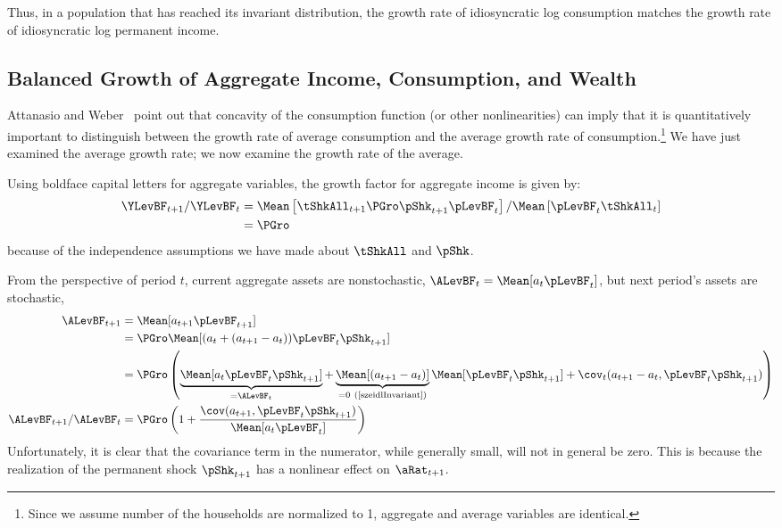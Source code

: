 \documentclass[BufferStockTheory]{subfiles}
\begin{document}
Thus, in a population that has reached its invariant distribution, the growth
rate of idiosyncratic log consumption matches the growth rate of idiosyncratic log permanent income.


\hypertarget{Growth-Rates-of-Aggregate-Income-and-Consumption}{}
\subsection{Balanced Growth of Aggregate Income, Consumption, and Wealth}
\label{subsec:cGroEqPGroQ}

Attanasio and Weber~\citeyearpar{aw95} point out that
concavity of the consumption function (or other nonlinearities) can
imply that it is quantitatively important to distinguish between the
growth rate of average consumption and the average growth rate of
consumption.\footnote{Since we assume number of the households are
  normalized to 1, aggregate and average variables are identical.}  We
have just examined the average growth rate; we now examine the growth
rate of the average.

Using boldface capital letters for aggregate
variables, the growth factor for aggregate income is given by:
\begin{align*}
  \YLevBF_{t+1}/\YLevBF_{t}  & = \Mean\left[\tShkAll_{t+1}\PGro \pShk_{t+1}\pLevBF_{t}\right]/\Mean\left[\pLevBF_{t}\tShkAll_{t}\right]  \\
                             & = \PGro
\end{align*}
because of the independence assumptions we have made about $\tShkAll$ and $\pShk$.

From the perspective of period $t$, current aggregate assets are nonstochastic, $\ALevBF_{t}=\Mean[a_{t} \pLevBF_{t}]$, but next period's assets are stochastic,   
\begin{align*}
  \ALevBF_{t+1} & = \Mean[a_{t+1} \pLevBF_{t+1}]
  \\              & = \PGro \Mean[(a_{t}+(a_{t+1}-a_{t}))\pLevBF_{t}\pShk_{t+1}]
  \\              & = \PGro \left(\underbrace{\Mean[a_{t}\pLevBF_{t}\pShk_{t+1}]}_{=\ALevBF_{t}}+\underbrace{\Mean[(a_{t+1}-a_{t})]}_{=0~(\text{\cite{szeidlInvariant})}}\Mean[\pLevBF_{t}\pShk_{t+1}]+\cov_{t}(a_{t+1}-a_{t},\pLevBF_{t}\pShk_{t+1})\right)
  \\ \ALevBF_{t+1}/\ALevBF_{t}                    & = \PGro \left(1+\frac{\cov(a_{t+1},\pLevBF_{t}\pShk_{t+1})}{\Mean[a_{t}\pLevBF_{t}]}\right)
\end{align*}
Unfortunately, it is clear that the covariance term in the numerator, while generally small, will not in general be zero.  This is because the realization of the permanent shock $\pShk_{t+1}$ has a nonlinear effect on $\aRat_{t+1}$.
\end{document}
